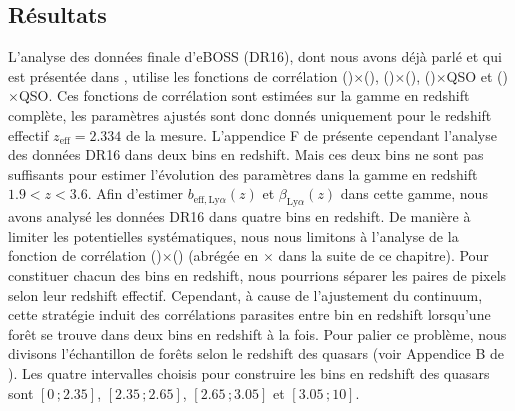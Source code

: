 \subsection{Résultats}
\label{subsec:data_ana}
L'analyse des données finale d'eBOSS (DR16), dont nous avons déjà parlé et qui est présentée dans \textcite{DuMasdesBourboux2020}, utilise les fonctions de corrélation \lya(\lya{})$\times$\lya{}(\lya{}), \lya{}(\lya{})$\times$\lya{}(\lyb{}), \lya{}(\lya{})$\times$QSO et \lya{}(\lyb{})$\times$QSO. Ces fonctions de corrélation sont estimées sur la gamme en redshift complète, les paramètres ajustés sont donc donnés uniquement pour le redshift effectif $z_{\mathrm{eff}} = \num{2.334}$ de la mesure. L'appendice F de \textcite{DuMasdesBourboux2020} présente cependant l'analyse des données DR16 dans deux bins en redshift. Mais ces deux bins ne sont pas suffisants pour estimer l'évolution des paramètres \lya{} dans la gamme en redshift $\num{1.9} < z  < \num{3.6}$.
Afin d'estimer $b_{\mathrm{eff},\mathrm{Ly}\alpha}(z)$ et $\beta_{\mathrm{Ly}\alpha}(z)$ dans cette gamme, nous avons analysé les données DR16 dans quatre bins en redshift. De manière à limiter les potentielles systématiques, nous nous limitons à l'analyse de la fonction de corrélation \lya{}(\lya{})$\times$\lya{}(\lya{}) (abrégée en \lya{}$\times$\lya{} dans la suite de ce chapitre).
Pour constituer chacun des bins en redshift, nous pourrions séparer les paires de pixels selon leur redshift effectif.
Cependant, à cause de l'ajustement du continuum, cette stratégie induit des corrélations parasites entre bin en redshift lorsqu'une forêt se trouve dans deux bins en redshift à la fois.
Pour palier ce problème, nous divisons l'échantillon de forêts selon le redshift des quasars (voir Appendice B de \textcite{Agathe2019a}).
Les quatre intervalles choisis pour construire les bins en redshift des quasars sont $[\num{0}\,;\num{2.35}]$, $[\num{2.35}\,;\num{2.65}]$, $[\num{2.65}\,;\num{3.05}]$ et $[\num{3.05}\,;\num{10}]$.
